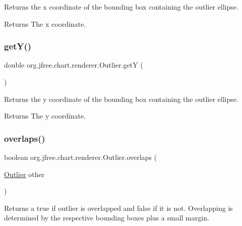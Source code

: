 Returns the x coordinate of the bounding box containing the outlier ellipse.

\begin{DoxyReturn}{Returns}
The x coordinate. 
\end{DoxyReturn}
\mbox{\label{classorg_1_1jfree_1_1chart_1_1renderer_1_1_outlier_a5463dba2b1374b4325c624ee3fb94b46}} 
\subsubsection{\texorpdfstring{get\+Y()}{getY()}}
{\footnotesize\ttfamily double org.\+jfree.\+chart.\+renderer.\+Outlier.\+getY (\begin{DoxyParamCaption}{ }\end{DoxyParamCaption})}

Returns the y coordinate of the bounding box containing the outlier ellipse.

\begin{DoxyReturn}{Returns}
The y coordinate. 
\end{DoxyReturn}
\mbox{\label{classorg_1_1jfree_1_1chart_1_1renderer_1_1_outlier_a91cbc61ff7c865ce61ee533585dca5dc}} 
\subsubsection{\texorpdfstring{overlaps()}{overlaps()}}
{\footnotesize\ttfamily boolean org.\+jfree.\+chart.\+renderer.\+Outlier.\+overlaps (\begin{DoxyParamCaption}\item[{\mbox{\hyperlink{classorg_1_1jfree_1_1chart_1_1renderer_1_1_outlier}{Outlier}}}]{other }\end{DoxyParamCaption})}

Returns a true if outlier is overlapped and false if it is not. Overlapping is determined by the respective bounding boxes plus a small margin.


